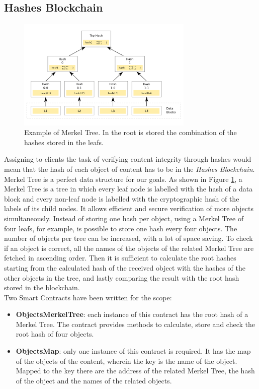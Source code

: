 \documentclass[conference,compsoc]{IEEEtran}
\begin{document}
\subsection{Hashes Blockchain}
\label{clienthashes}
\begin{figure}[!h]
	\centering
	\includegraphics[width=3.3in]{images/merkeltree.png}
	
	\caption{Example of Merkel Tree. In the root is stored the combination of the hashes stored in the leafs.}
	\label{fig:tree}
\end{figure} 
Assigning to clients the task of verifying content integrity through hashes would mean that the hash of each object of content has to be in the \textit{Hashes Blockchain}. Merkel Tree is a perfect data structure for our goals. As shown in Figure \ref{fig:tree}, a Merkel Tree is a tree in which every leaf node is labelled with the hash of a data block and every non-leaf node is labelled with the cryptographic hash of the labels of its child nodes. It allows efficient and secure verification of more objects simultaneously. Instead of storing one hash per object, using a Merkel Tree of four leafs, for example, is possible to store one hash every four objects. The number of objects per tree can be increased, with a lot of space saving. To check if an object is correct, all the names of the objects of the related Merkel Tree are fetched in ascending order. Then it is sufficient to calculate the root hashes starting from the calculated hash of the received object with the hashes of the other objects in the tree, and lastly comparing the result with the root hash stored in the blockchain.\\
Two Smart Contracts have been written for the scope:
\begin{itemize}
	\item \textbf{ObjectsMerkelTree}: each instance of this contract has the root hash of a Merkel Tree. The contract provides methods to calculate, store and check the root hash of four objects.
	\item \textbf{ObjectsMap}: only one instance of this contract is required. It has the map of the objects of the content, wherein the key is the name of the object. Mapped to the key there are the address of the related Merkel Tree, the hash of the object and the names of the related objects. 
\end{itemize}
\end{document}
